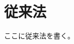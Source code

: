 \documentclass[fleqn]{jreport}
\begin{document}
    \chapter{従来法}
        ここに従来法を書く。
\end{document}
